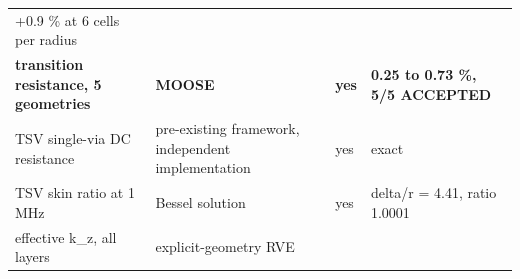 \documentclass[10pt,]{article}
\begin{document}
\begin{longtable}[]{@{}llll@{}}
\begin{minipage}[t]{0.22\columnwidth}
+0.9 \% at 6 cells per radius\strut
\end{minipage}\tabularnewline
\begin{minipage}[t]{0.22\columnwidth}\raggedright
\textbf{transition resistance, 5 geometries}\strut
\end{minipage} & \begin{minipage}[t]{0.22\columnwidth}\raggedright
\textbf{MOOSE}\strut
\end{minipage} & \begin{minipage}[t]{0.22\columnwidth}\raggedright
\textbf{yes}\strut
\end{minipage} & \begin{minipage}[t]{0.22\columnwidth}\raggedright
\textbf{0.25 to 0.73 \%, 5/5 ACCEPTED}\strut
\end{minipage}\tabularnewline
\begin{minipage}[t]{0.22\columnwidth}\raggedright
TSV single-via DC resistance\strut
\end{minipage} & \begin{minipage}[t]{0.22\columnwidth}\raggedright
pre-existing framework, independent implementation\strut
\end{minipage} & \begin{minipage}[t]{0.22\columnwidth}\raggedright
yes\strut
\end{minipage} & \begin{minipage}[t]{0.22\columnwidth}\raggedright
exact\strut
\end{minipage}\tabularnewline
\begin{minipage}[t]{0.22\columnwidth}\raggedright
TSV skin ratio at 1 MHz\strut
\end{minipage} & \begin{minipage}[t]{0.22\columnwidth}\raggedright
Bessel solution\strut
\end{minipage} & \begin{minipage}[t]{0.22\columnwidth}\raggedright
yes\strut
\end{minipage} & \begin{minipage}[t]{0.22\columnwidth}\raggedright
delta/r = 4.41, ratio 1.0001\strut
\end{minipage}\tabularnewline
\begin{minipage}[t]{0.22\columnwidth}\raggedright
effective k\_z, all layers\strut
\end{minipage} & \begin{minipage}[t]{0.22\columnwidth}\raggedright
explicit-geometry RVE\strut
\end{minipage} & \begin{minipage}[t]{0.22\columnwidth}\raggedright

\end{minipage}
\end{longtable}
\end{document}
